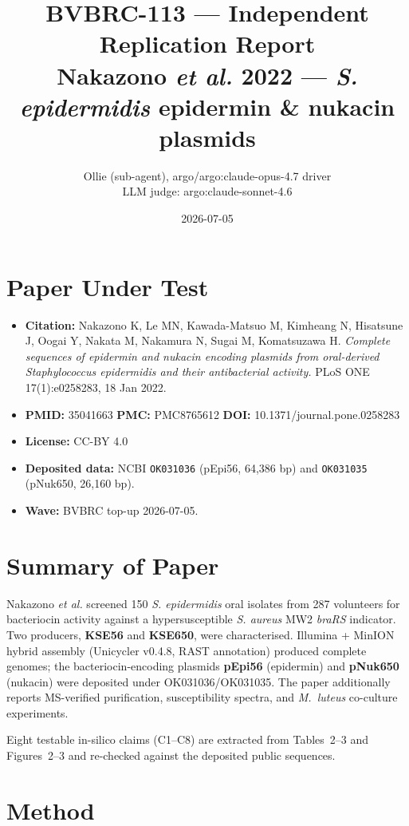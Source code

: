 \documentclass[11pt,letterpaper]{article}
\title{BVBRC-113 --- Independent Replication Report\\
\large Nakazono \textit{et al.} 2022 --- \textit{S. epidermidis} epidermin \& nukacin plasmids}
\author{Ollie (sub-agent), argo/argo:claude-opus-4.7 driver\\
LLM judge: argo:claude-sonnet-4.6}
\date{2026-07-05}
\begin{document}
\maketitle

\section{Paper Under Test}

\begin{itemize}
  \item \textbf{Citation:} Nakazono K, Le MN, Kawada-Matsuo M, Kimheang N, Hisatsune J, Oogai Y, Nakata M, Nakamura N, Sugai M, Komatsuzawa H. \textit{Complete sequences of epidermin and nukacin encoding plasmids from oral-derived Staphylococcus epidermidis and their antibacterial activity.} PLoS ONE 17(1):e0258283, 18 Jan 2022.
  \item \textbf{PMID:} 35041663 \quad \textbf{PMC:} PMC8765612 \quad \textbf{DOI:} 10.1371/journal.pone.0258283
  \item \textbf{License:} CC-BY 4.0
  \item \textbf{Deposited data:} NCBI \texttt{OK031036} (pEpi56, 64{,}386 bp) and \texttt{OK031035} (pNuk650, 26{,}160 bp).
  \item \textbf{Wave:} BVBRC top-up 2026-07-05.
\end{itemize}

\section{Summary of Paper}

Nakazono \textit{et al.} screened 150 \textit{S. epidermidis} oral isolates from 287 volunteers for bacteriocin activity against a hypersusceptible \textit{S. aureus} MW2 \textit{braRS} indicator. Two producers, \textbf{KSE56} and \textbf{KSE650}, were characterised. Illumina + MinION hybrid assembly (Unicycler v0.4.8, RAST annotation) produced complete genomes; the bacteriocin-encoding plasmids \textbf{pEpi56} (epidermin) and \textbf{pNuk650} (nukacin) were deposited under OK031036/OK031035. The paper additionally reports MS-verified purification, susceptibility spectra, and \textit{M.\ luteus} co-culture experiments.

Eight testable in-silico claims (C1--C8) are extracted from Tables~2--3 and Figures~2--3 and re-checked against the deposited public sequences.

\section{Method}
\end{document}
